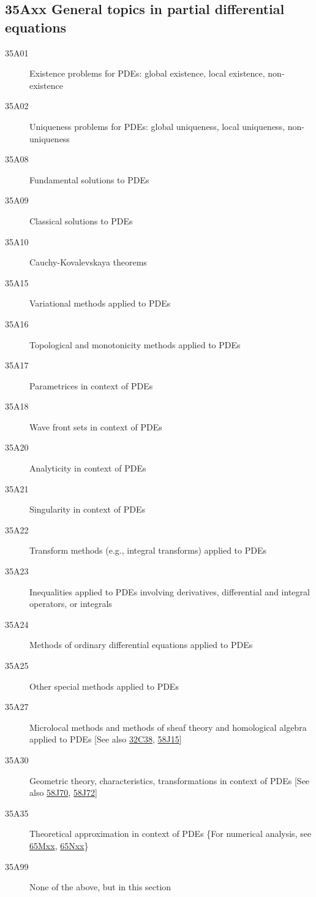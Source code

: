 \subsection*{35Axx  General topics in partial differential equations}\label{35Axx}
\begin{description}  
\item [35A01]\label{35A01} Existence problems  for  PDEs: global existence, local existence, non-existence 
\item [35A02]\label{35A02} Uniqueness problems for  PDEs: global uniqueness, local uniqueness, non-uniqueness 
\item [35A08]\label{35A08} Fundamental solutions to PDEs
\item [35A09]\label{35A09} Classical solutions to PDEs
\item [35A10]\label{35A10} Cauchy-Kovalevskaya theorems
\item [35A15]\label{35A15} Variational methods applied to PDEs
\item [35A16]\label{35A16} Topological and monotonicity methods applied to PDEs
\item [35A17]\label{35A17} Parametrices in context of PDEs
\item [35A18]\label{35A18} Wave front sets in context of PDEs
\item [35A20]\label{35A20} Analyticity in context of  PDEs
\item [35A21]\label{35A21} Singularity in context of PDEs
\item [35A22]\label{35A22} Transform methods (e.g., integral transforms) applied to  PDEs
\item [35A23]\label{35A23} Inequalities applied to PDEs involving derivatives, differential and integral operators, or integrals
\item [35A24]\label{35A24} Methods of ordinary differential equations applied to PDEs
\item [35A25]\label{35A25} Other special methods applied to PDEs
\item [35A27]\label{35A27} Microlocal methods and  methods of sheaf theory and homological algebra applied to PDEs [See also \hyperref[32C38]{32C38}, \hyperref[58J15]{58J15}]
\item [35A30]\label{35A30} Geometric theory, characteristics, transformations in context of PDEs  [See also \hyperref[58J70]{58J70}, \hyperref[58J72]{58J72}]
\item [35A35]\label{35A35} Theoretical approximation in context of PDEs \{For numerical analysis, see \hyperref[65Mxx]{65Mxx}, \hyperref[65Nxx]{65Nxx}\}
\item [35A99]\label{35A99} None of the above, but in this section
\end{description}
